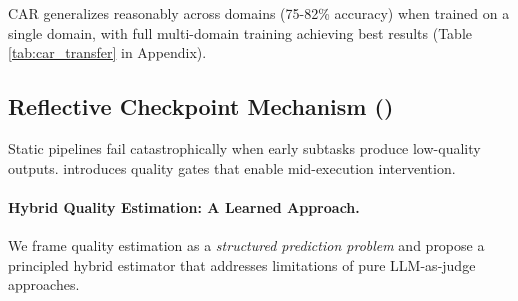 \documentclass{article}
\theoremstyle{plain}
\theoremstyle{definition}
\theoremstyle{remark}
\begin{document}

CAR generalizes reasonably across domains (75-82\% accuracy) when trained on a single domain, with full multi-domain training achieving best results (Table \ref{tab:car_transfer} in Appendix).



\subsection{Reflective Checkpoint Mechanism (\rcm{})}
\label{sec:rcm}

Static pipelines fail catastrophically when early subtasks produce low-quality outputs. \rcm{} introduces quality gates that enable mid-execution intervention.

%
%
%
\paragraph{Hybrid Quality Estimation: A Learned Approach.}

We frame quality estimation as a \emph{structured prediction
	problem} and propose a principled hybrid estimator that
addresses limitations of pure LLM-as-judge approaches.
\end{document}
